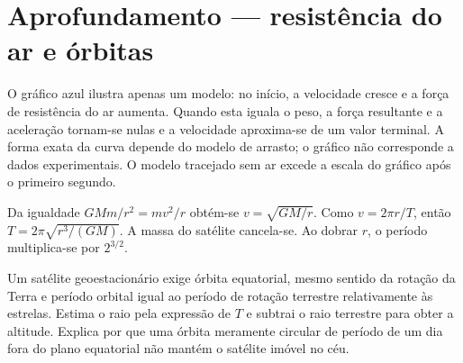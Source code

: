 \documentclass[11pt,a4paper,oneside]{book}
\newcommand{\si}[1]{\ensuremath{\mathrm{##1}}}
\begin{document}
\section{Aprofundamento — resistência do ar e órbitas}
\begin{center}
\end{center}
O gráfico azul ilustra apenas um modelo: no início, a velocidade
cresce e a força de resistência do ar aumenta. Quando esta iguala o
peso, a força resultante e a aceleração tornam-se nulas e a
velocidade aproxima-se de um valor terminal. A forma exata da curva
depende do modelo de arrasto; o gráfico não corresponde a dados
experimentais. O modelo tracejado sem ar excede a escala do gráfico
após o primeiro segundo.
\begin{exemplo}[title=Exemplo resolvido — satélite circular]
Da igualdade $GMm/r^2=mv^2/r$ obtém-se
$v=\sqrt{GM/r}$. Como $v=2\pi r/T$, então
$T=2\pi\sqrt{r^3/(GM)}$. A massa do satélite cancela-se.
Ao dobrar $r$, o período multiplica-se por $2^{3/2}$.
\end{exemplo}
\begin{mundo}
Um satélite geoestacionário exige órbita equatorial, mesmo sentido
da rotação da Terra e período orbital igual ao período de rotação
terrestre relativamente às estrelas. Estima o raio pela expressão
de $T$ e subtrai o raio terrestre para obter a altitude. Explica
por que uma órbita meramente circular de período de um dia fora
do plano equatorial não mantém o satélite imóvel no céu.
\end{mundo}
\end{document}
